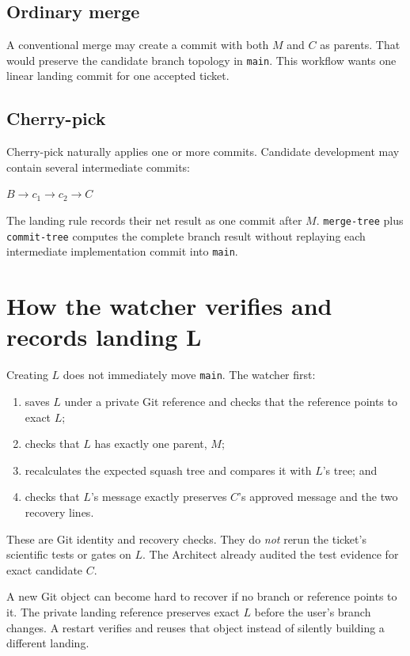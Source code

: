 \documentclass[10pt,twocolumn]{article}
\newcommand{\code}[1]{\texttt{#1}}
\begin{document}
\subsection{Ordinary merge}

A conventional merge may create a commit with both $M$ and $C$ as parents.
That would preserve the candidate branch topology in \code{main}. This
workflow wants one linear landing commit for one accepted ticket.

\subsection{Cherry-pick}

Cherry-pick naturally applies one or more commits. Candidate development may
contain several intermediate commits:

\begin{center}
$B\rightarrow c_1\rightarrow c_2\rightarrow C$
\end{center}

The landing rule records their net result as one commit after $M$.
\code{merge-tree} plus \code{commit-tree} computes the complete branch result
without replaying each intermediate implementation commit into \code{main}.

\section{How the watcher verifies and records landing L}

Creating $L$ does not immediately move \code{main}. The watcher first:

\begin{enumerate}
  \item saves $L$ under a private Git reference and checks that the reference points to exact $L$;
  \item checks that $L$ has exactly one parent, $M$;
  \item recalculates the expected squash tree and compares it with $L$'s tree; and
  \item checks that $L$'s message exactly preserves $C$'s approved message and the two recovery lines.
\end{enumerate}

These are Git identity and recovery checks. They do \emph{not} rerun the
ticket's scientific tests or gates on $L$. The Architect already audited the
test evidence for exact candidate $C$.

\begin{warningbox}
A new Git object can become hard to recover if no branch or reference points
to it. The private landing reference preserves exact $L$ before the user's
branch changes. A restart verifies and reuses that object instead of silently
building a different landing.
\end{warningbox}
\end{document}
